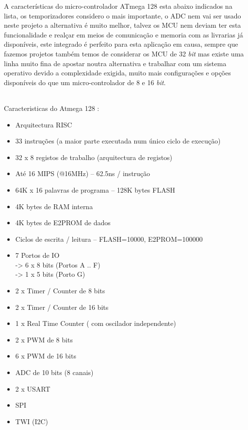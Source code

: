 \newpage
A características do micro-controlador ATmega 128 esta abaixo indicados na lista, os temporizadores considero o mais importante, o ADC nem vai ser usado neste projeto a alternativa é muito melhor, talvez os MCU nem deviam ter esta funcionalidade e realçar em meios de comunicação e memoria com as livrarias já disponíveis, este integrado é perfeito para esta aplicação em causa, sempre que fazemos projetos também temos de considerar os MCU de 32 \textit{bit} mas existe uma linha muito fina de apostar noutra alternativa e trabalhar com um sistema operativo devido a complexidade exigida, muito mais configurações e opções disponíveis do que um micro-controlador de 8 e 16 \textit{bit}.
\\
\\
\begin{minipage}{\linewidth}
{\Large Caracteristicas do Atmega 128 :}
\begin{itemize}	
	\setlength\itemsep{-0.7em}
	\item Arquitectura RISC
	\item 33 instruções (a maior parte executada num único ciclo de execução)
	\item 32 x 8 registos de trabalho (arquitectura de registos)
	\item Até 16 MIPS (@16MHz) – 62.5ns / instrução
	\item 64K x 16 palavras de programa – 128K bytes FLASH
	\item 4K bytes de RAM interna
	\item 4K bytes de E2PROM de dados
	\item Ciclos de escrita / leitura – FLASH=10000, E2PROM=100000
	\item 7 Portos de IO \\
		\hspace*{.5cm}	-> 6 x 8 bits (Portos A .. F) \\
		\hspace*{.5cm}	-> 1 x 5 bits (Porto G)
	\item 2 x Timer / Counter de 8 bits
	\item 2 x Timer / Counter de 16 bits
	\item 1 x Real Time Counter ( com oscilador independente)
	\item 2 x PWM de 8 bits
	\item 6 x PWM de 16 bits
	\item ADC de 10 bits (8 canais)
	\item 2 x USART
	\item SPI
	\item TWI (I2C)
\end{itemize}
\end{minipage}
